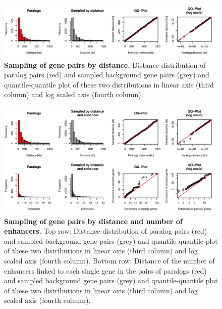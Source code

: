 \documentclass[a4paper,twoside=true,openright,parskip=full,chapterprefix=true,11pt,headings=normal,bibliography=totoc,listof=totoc,titlepage=on,captions=tableabove,draft=false]{scrreprt}
\theoremstyle{definition}
\theoremstyle{definition}
\theoremstyle{definition}
\theoremstyle{remark}
\begin{document}
\begin{figure}

{\centering \includegraphics[width=0.5\linewidth]{figures/paralog/SI/figS3} 

}

\caption{\textbf{Sampling of gene pairs by distance.} Distance
distribution of paralog pairs (red) and sampled background gene pairs
(grey) and quantile-quantile plot of these two distributions in linear
axis (third column) and log scaled axis (fourth column).}\label{fig:samplingDist}
\end{figure}






\begin{figure}

{\centering \includegraphics[width=0.5\linewidth]{figures/paralog/SI/figS4} 

}

\caption{\textbf{Sampling of gene pairs by distance and
number of enhancers.} Top row: Distance distribution of paralog pairs
(red) and sampled background gene pairs (grey) and quantile-quantile
plot of these two distributions in linear axis (third column) and log
scaled axis (fourth column). Bottom row: Distance of the number of
enhancers linked to each single gene in the pairs of paralogs (red) and
sampled background gene pairs (grey) and quantile-quantile plot of these
two distributions in linear axis (third column) and log scaled axis
(fourth column).}\label{fig:samplingDistEh}
\end{figure}
\end{document}
